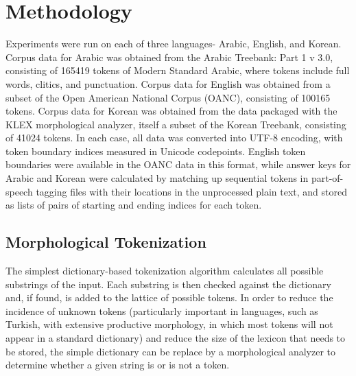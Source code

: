 \chapter{Methodology}

Experiments were run on each of three languages- Arabic, English, and Korean. Corpus data for Arabic was obtained from the Arabic Treebank: Part 1 v 3.0\cite{maamouri05}, consisting of 165419 tokens of Modern Standard Arabic, where tokens include full words, clitics, and punctuation. Corpus data for English was obtained from a subset of the Open American National Corpus (OANC)\cite{oanc}, consisting of 100165 tokens. Corpus data for Korean was obtained from the data packaged with the KLEX morphological analyzer\cite{han04}, itself a subset of the Korean Treebank, consisting of 41024 tokens. In each case, all data was converted into UTF-8 encoding, with token boundary indices measured in Unicode codepoints. English token boundaries were available in the OANC data in this format, while answer keys for Arabic and Korean were calculated by matching up sequential tokens in part-of-speech tagging files with their locations in the unprocessed plain text, and stored as lists of pairs of starting and ending indices for each token.

\section{Morphological Tokenization}
The simplest dictionary-based tokenization algorithm calculates all possible substrings of the input. Each substring is then checked against the dictionary and, if found, is added to the lattice of possible tokens. In order to reduce the incidence of unknown tokens (particularly important in languages, such as Turkish, with extensive productive morphology, in which most tokens will not appear in a standard dictionary) and reduce the size of the lexicon that needs to be stored, the simple dictionary can be replace by a morphological analyzer to determine whether a given string is or is not a token.

